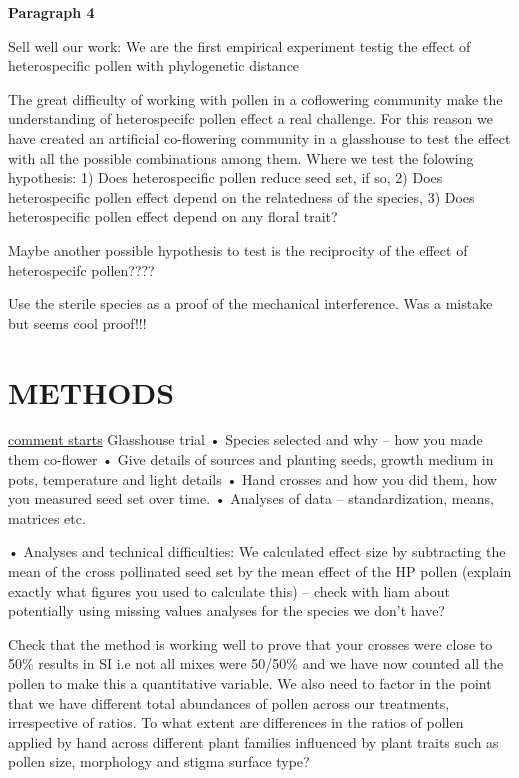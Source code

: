 \documentclass[11pt,a4paper]{article}
\begin{document}
\textbf{Paragraph 4}

Sell well our work: We are the first empirical experiment testig the
effect of heterospecific pollen with phylogenetic distance

The great difficulty of working with pollen in a coflowering community
make the understanding of heterospecifc pollen effect a real challenge.
For this reason we have created an artificial co-flowering community in
a glasshouse to test the effect with all the possible combinations among
them. Where we test the folowing hypothesis: 1) Does heterospecific
pollen reduce seed set, if so, 2) Does heterospecific pollen effect
depend on the relatedness of the species, 3) Does heterospecific pollen
effect depend on any floral trait?

Maybe another possible hypothesis to test is the reciprocity of the
effect of heterospecifc pollen????

Use the sterile species as a proof of the mechanical interference. Was a
mistake but seems cool proof!!!

\section{METHODS}\label{methods}

\href{}{comment starts} Glasshouse trial • Species selected and why --
how you made them co-flower • Give details of sources and planting
seeds, growth medium in pots, temperature and light details • Hand
crosses and how you did them, how you measured seed set over time. •
Analyses of data -- standardization, means, matrices etc.

• Analyses and technical difficulties: We calculated effect size by
subtracting the mean of the cross pollinated seed set by the mean effect
of the HP pollen (explain exactly what figures you used to calculate
this) -- check with liam about potentially using missing values analyses
for the species we don't have?

Check that the method is working well to prove that your crosses were
close to 50\% results in SI i.e not all mixes were 50/50\% and we have
now counted all the pollen to make this a quantitative variable. We also
need to factor in the point that we have different total abundances of
pollen across our treatments, irrespective of ratios. To what extent are
differences in the ratios of pollen applied by hand across different
plant families influenced by plant traits such as pollen size,
morphology and stigma surface type?
\end{document}
